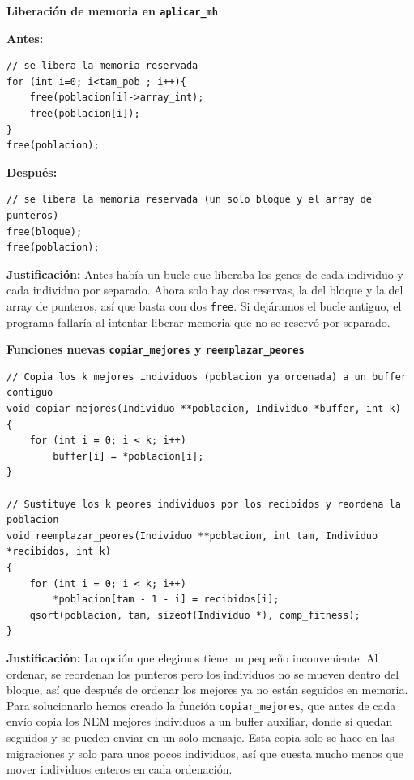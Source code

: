 \documentclass[12pt]{article}
\begin{document}
\begin{enumerate}

\medskip
\noindent\textbf{Liberación de memoria en \texttt{aplicar\_mh}}\par
\smallskip

\noindent\textbf{Antes:}
\begin{lstlisting}[style=EstiloC]
// se libera la memoria reservada
for (int i=0; i<tam_pob ; i++){
    free(poblacion[i]->array_int);
    free(poblacion[i]);
}
free(poblacion);
\end{lstlisting}

\noindent\textbf{Después:}
\begin{lstlisting}[style=EstiloC]
// se libera la memoria reservada (un solo bloque y el array de punteros)
free(bloque);
free(poblacion);
\end{lstlisting}

\textbf{Justificación:} Antes había un bucle que liberaba los genes de cada individuo y cada individuo por separado. Ahora solo hay dos reservas, la del bloque y la del array de punteros, así que basta con dos \texttt{free}. Si dejáramos el bucle antiguo, el programa fallaría al intentar liberar memoria que no se reservó por separado.

\vspace{0.5cm}


\medskip
\noindent\textbf{Funciones nuevas \texttt{copiar\_mejores} y \texttt{reemplazar\_peores}}\par
\smallskip


\begin{lstlisting}[style=EstiloC]
// Copia los k mejores individuos (poblacion ya ordenada) a un buffer contiguo
void copiar_mejores(Individuo **poblacion, Individuo *buffer, int k)
{
    for (int i = 0; i < k; i++)
        buffer[i] = *poblacion[i];
}

// Sustituye los k peores individuos por los recibidos y reordena la poblacion
void reemplazar_peores(Individuo **poblacion, int tam, Individuo *recibidos, int k)
{
    for (int i = 0; i < k; i++)
        *poblacion[tam - 1 - i] = recibidos[i];
    qsort(poblacion, tam, sizeof(Individuo *), comp_fitness);
}
\end{lstlisting}

\textbf{Justificación:} La opción que elegimos tiene un pequeño inconveniente. Al ordenar, se reordenan los punteros pero los individuos no se mueven dentro del bloque, así que después de ordenar los mejores ya no están seguidos en memoria. Para solucionarlo hemos creado la función \texttt{copiar\_mejores}, que antes de cada envío copia los NEM mejores individuos a un buffer auxiliar, donde sí quedan seguidos y se pueden enviar en un solo mensaje. Esta copia solo se hace en las migraciones y solo para unos pocos individuos, así que cuesta mucho menos que mover individuos enteros en cada ordenación.


\end{enumerate}
\end{document}
